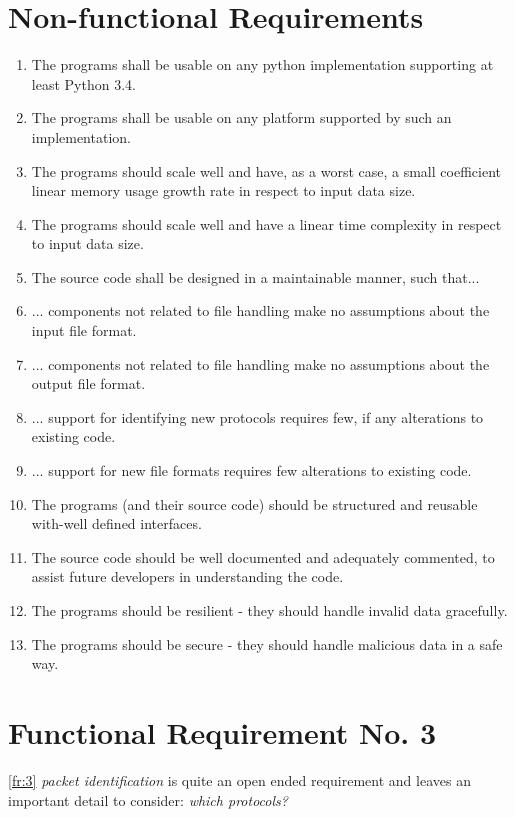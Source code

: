 \documentclass[10pt,a4paper,notitlepage]{report}
\begin{document}
\section{Non-functional Requirements}
\begin{enumerate}[label=\bfseries NFR\arabic*:]
\item \label{nfr:1} The programs shall be usable on any python implementation supporting at least Python 3.4.
\item \label{nfr:2} The programs shall be usable on any platform supported by such an implementation.
\item \label{nfr:3} The programs should scale well and have, as a worst case, a small coefficient linear memory usage growth rate in respect to input data size.
\item \label{nfr:4} The programs should scale well and have a linear time complexity in respect to input data size.
\item \label{nfr:5} The source code shall be designed in a maintainable manner, such that...
\item \label{nfr:6} ... components not related to file handling make no assumptions about the input file format.
\item \label{nfr:7} ... components not related to file handling make no assumptions about the output file format.
\item \label{nfr:8} ... support for identifying new protocols requires few, if any alterations to existing code.
\item \label{nfr:9} ... support for new file formats requires few alterations to existing code.
\item \label{nfr:10} The programs (and their source code) should be structured and reusable with-well defined interfaces.
\item \label{nfr:11} The source code should be well documented and adequately commented, to assist future developers in understanding the code.
\item \label{nfr:12} The programs should be resilient - they should handle invalid data gracefully.
\item \label{nfr:13} The programs should be secure - they should handle malicious data in a safe way.
\end{enumerate}

\section{Functional Requirement No. 3}
\ref{fr:3} \emph{packet identification} is quite an open ended requirement and leaves an important detail to consider: \emph{which protocols?}
\end{document}
